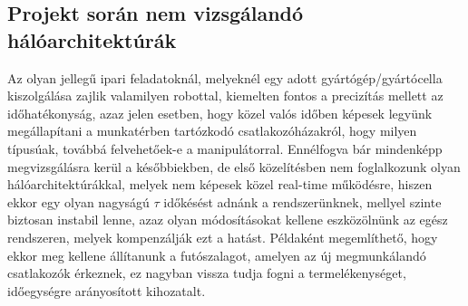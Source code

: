 \documentclass{article}
\begin{document}
\subsection{Projekt során nem vizsgálandó hálóarchitektúrák}
Az olyan jellegű ipari feladatoknál, melyeknél egy adott gyártógép/gyártócella kiszolgálása
zajlik valamilyen robottal, kiemelten fontos a precizítás mellett az időhatékonyság, 
azaz jelen esetben, hogy közel valós időben képesek legyünk megállapítani a
munkatérben tartózkodó csatlakozóházakról, hogy milyen típusúak, továbbá felvehetőek-e 
a manipulátorral. Ennélfogva bár mindenképp megvizsgálásra kerül a későbbiekben, de 
első közelítésben nem foglalkozunk olyan hálóarchitektúrákkal, melyek nem képesek közel 
real-time működésre, hiszen ekkor egy olyan nagyságú $\tau$ időkésést adnánk a 
rendszerünknek, mellyel szinte biztosan instabil lenne, azaz olyan módosításokat 
kellene eszközölnünk az egész rendszeren, melyek kompenzálják ezt a hatást. Példaként 
megemlíthető, hogy ekkor meg kellene állítanunk a futószalagot, amelyen az új 
megmunkálandó csatlakozók érkeznek, ez nagyban vissza tudja fogni a termelékenységet, 
időegységre arányosított kihozatalt.
\end{document}
